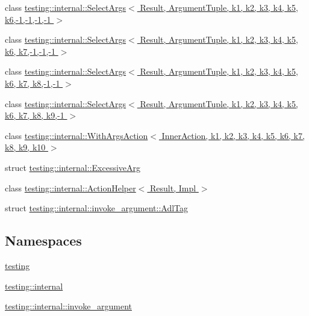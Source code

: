 \begin{DoxyCompactItemize}
\item 
class \hyperlink{classtesting_1_1internal_1_1SelectArgs_3_01Result_00_01ArgumentTuple_00_01k1_00_01k2_00_01k3_00_c6c29b62346e4d7879bc19ed55d96004}{testing\+::internal\+::\+Select\+Args$<$ Result, Argument\+Tuple, k1, k2, k3, k4, k5, k6,-\/1,-\/1,-\/1,-\/1 $>$}
\item 
class \hyperlink{classtesting_1_1internal_1_1SelectArgs_3_01Result_00_01ArgumentTuple_00_01k1_00_01k2_00_01k3_00_d8106922b84b5ce2491b61ffee01e097}{testing\+::internal\+::\+Select\+Args$<$ Result, Argument\+Tuple, k1, k2, k3, k4, k5, k6, k7,-\/1,-\/1,-\/1 $>$}
\item 
class \hyperlink{classtesting_1_1internal_1_1SelectArgs_3_01Result_00_01ArgumentTuple_00_01k1_00_01k2_00_01k3_00_9d4b115de35df33f8c94d8d1b36790c1}{testing\+::internal\+::\+Select\+Args$<$ Result, Argument\+Tuple, k1, k2, k3, k4, k5, k6, k7, k8,-\/1,-\/1 $>$}
\item 
class \hyperlink{classtesting_1_1internal_1_1SelectArgs_3_01Result_00_01ArgumentTuple_00_01k1_00_01k2_00_01k3_00_6cec9358efe806d84292a8e378f8b1d2}{testing\+::internal\+::\+Select\+Args$<$ Result, Argument\+Tuple, k1, k2, k3, k4, k5, k6, k7, k8, k9,-\/1 $>$}
\item 
class \hyperlink{classtesting_1_1internal_1_1WithArgsAction}{testing\+::internal\+::\+With\+Args\+Action$<$ Inner\+Action, k1, k2, k3, k4, k5, k6, k7, k8, k9, k10 $>$}
\item 
struct \hyperlink{structtesting_1_1internal_1_1ExcessiveArg}{testing\+::internal\+::\+Excessive\+Arg}
\item 
class \hyperlink{classtesting_1_1internal_1_1ActionHelper}{testing\+::internal\+::\+Action\+Helper$<$ Result, Impl $>$}
\item 
struct \hyperlink{structtesting_1_1internal_1_1invoke__argument_1_1AdlTag}{testing\+::internal\+::invoke\+\_\+argument\+::\+Adl\+Tag}
\end{DoxyCompactItemize}
\subsection*{Namespaces}
\begin{DoxyCompactItemize}
\item 
 \hyperlink{namespacetesting}{testing}
\item 
 \hyperlink{namespacetesting_1_1internal}{testing\+::internal}
\item 
 \hyperlink{namespacetesting_1_1internal_1_1invoke__argument}{testing\+::internal\+::invoke\+\_\+argument}
\end{DoxyCompactItemize}
